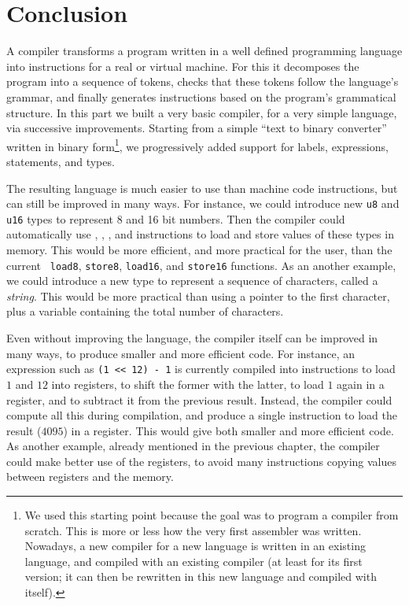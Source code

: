 
\chapter*{Conclusion}

A compiler transforms a program written in a well defined programming language
into instructions for a real or virtual machine. For this it decomposes the
program into a sequence of tokens, checks that these tokens follow the
language's grammar, and finally generates instructions based on the program's
grammatical structure. In this part we built a very basic compiler, for a very
simple language, via successive improvements. Starting from a simple ``text to
binary converter'' written in binary form\footnote{We used this starting point
because the goal was to program a compiler from scratch. This is more or less
how the very first assembler was written. Nowadays, a new compiler for a new
language is written in an existing language, and compiled with an existing
compiler (at least for its first version; it can then be rewritten in this new
language and compiled with itself).}, we progressively added support for
labels, expressions, statements, and types.

The resulting language is much easier to use than machine code instructions,
but can still be improved in many ways. For instance, we could introduce new
{\tt u8} and {\tt u16} types to represent 8 and 16 bit numbers. Then the
compiler could automatically use , , , and
 instructions to load and store values of these types in memory. This
would be more efficient, and more practical for the user, than the current {\tt
load8}, {\tt store8}, {\tt load16}, and {\tt store16} functions. As an another
example, we could introduce a new type to represent a sequence of characters,
called a {\em string}. This would be more practical than using a pointer to the
first character, plus a variable containing the total number of characters.

Even without improving the language, the compiler itself can be improved in
many ways, to produce smaller and more efficient code. For instance, an
expression such as {\tt (1 {<}{<} 12) - 1} is currently compiled into
instructions to load $1$ and $12$ into registers, to shift the former with the
latter, to load $1$ again in a register, and to subtract it from the previous
result. Instead, the compiler could compute all this during compilation, and
produce a single instruction to load the result ($4095$) in a register. This
would give both smaller and more efficient code. As another example, already
mentioned in the previous chapter, the compiler could make better use of the
registers, to avoid many instructions copying values between registers and the
memory.

